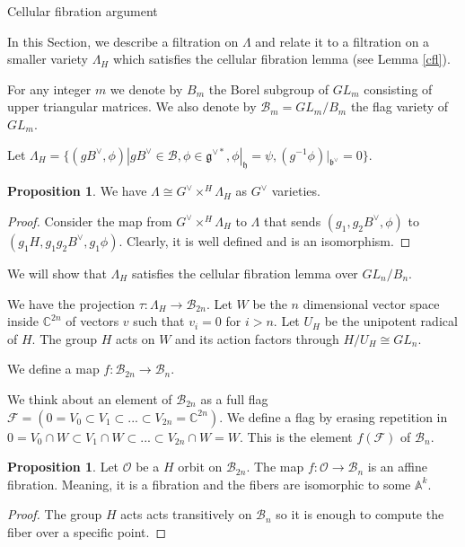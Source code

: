 \documentclass[12pt]{article}
\newcommand{\B}{\mathcal{B}}
\newcommand{\C}{\mathbb{C}}
\newcommand{\s}{\mathcal{O}}
\newcommand{\<}{\langle}
\renewcommand{\>}{\rangle}
\theoremstyle{plain}
\theoremstyle{definition}
\newtheorem{prop}[theorem]{Proposition}
\begin{document}
\begin{section}{Cellular fibration argument}\label{s6}

In this Section, we describe a filtration on $\Lambda$ and relate it to a filtration on a smaller variety $\Lambda_H$ which satisfies the cellular fibration lemma (see Lemma \ref{cfl}).

For any integer $m$ we denote by $B_{m}$ the Borel subgroup of $GL_{m}$ consisting of upper triangular matrices. We also denote by $\B_m=GL_{m}/B_{m}$ the flag variety of $GL_m$. 

Let $\Lambda_H=\{(gB^\vee,\phi)|gB^\vee\in \B,\phi\in \mathfrak{g}^{\vee*},\phi|_\mathfrak{h}=\psi,(g^{-1}\phi)|_\mathfrak{b^\vee}=0\}$.

\begin{prop}
    We have $\Lambda\cong G^\vee\times^H \Lambda_H$ as $G^\vee$ varieties.
\end{prop}

\begin{proof}
    Consider the map from $G^\vee\times^H \Lambda_H$ to $\Lambda$ that sends $(g_1,g_2B^\vee,\phi)$ to $(g_1H,g_1g_2B^\vee,g_1\phi)$. Clearly, it is well defined and is an isomorphism.
\end{proof}

We will show that $\Lambda_H$ satisfies the cellular fibration lemma over $GL_n/B_n$.

We have the projection $\tau:\Lambda_H\rightarrow \B_{2n}$. Let $W$ be the $n$ dimensional vector space inside $\C^{2n}$ of vectors $v$ such that $v_i=0$ for $i>n$. Let $U_H$ be the unipotent radical of $H$. The group $H$ acts on $W$ and its action factors through $H/U_H\cong GL_n$.

We define a map $f:\B_{2n}\rightarrow\B_n$. 

We think about an element of $\B_{2n}$ as a full flag $\mathcal{F}=(0=V_0\subset V_1\subset...\subset V_{2n}=\C^{2n})$. We define a flag by erasing repetition in $0=V_0\cap W\subset V_1\cap W\subset...\subset V_{2n}\cap W=W$. This is the element $f(\mathcal{F})$ of $\B_n$.

\begin{prop}\label{affine fibers}
    Let $\s$ be a $H$ orbit on $\B_{2n}$. The map $f:\s\rightarrow\B_n$ is an affine fibration. Meaning, it is a fibration and the fibers are isomorphic to some $\mathbb{A}^k$.
\end{prop}

\begin{proof}
    The group $H$ acts acts transitively on $\B_n$ so it is enough to compute the fiber over a specific point. 
    

\end{proof}
\end{section}
\end{document}
